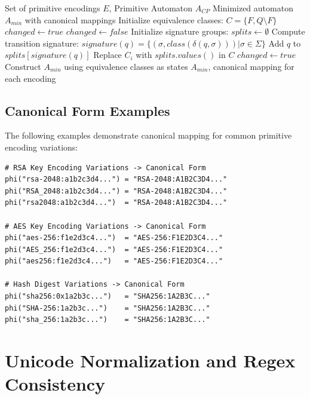 \documentclass[11pt,a4paper]{article}
\begin{document}
\begin{algorithm}
\caption{Cryptographic Primitive State Minimization}
\begin{algorithmic}[1]
\REQUIRE Set of primitive encodings $E$, Primitive Automaton $A_{CP}$
\ENSURE Minimized automaton $A_{min}$ with canonical mappings
\STATE Initialize equivalence classes: $C = \{F, Q \setminus F\}$
\STATE $changed \leftarrow true$
    \STATE $changed \leftarrow false$
        \STATE Initialize signature groups: $splits \leftarrow \emptyset$
            \STATE Compute transition signature: $signature(q) = \{(\sigma, class(\delta(q, \sigma))) | \sigma \in \Sigma\}$
            \STATE Add $q$ to $splits[signature(q)]$
        \ENDFOR
            \STATE Replace $C_i$ with $splits.values()$ in $C$
            \STATE $changed \leftarrow true$
        \ENDIF
    \ENDFOR
\ENDWHILE
\STATE Construct $A_{min}$ using equivalence classes as states
\RETURN $A_{min}$, canonical mapping for each encoding
\end{algorithmic}
\end{algorithm}

\subsection{Canonical Form Examples}

The following examples demonstrate canonical mapping for common primitive encoding variations:

\begin{lstlisting}[caption=Canonical Mapping Examples]
# RSA Key Encoding Variations -> Canonical Form
phi("rsa-2048:a1b2c3d4...") = "RSA-2048:A1B2C3D4..."
phi("RSA_2048:a1b2c3d4...") = "RSA-2048:A1B2C3D4..."
phi("rsa2048:a1b2c3d4...")  = "RSA-2048:A1B2C3D4..."

# AES Key Encoding Variations -> Canonical Form  
phi("aes-256:f1e2d3c4...")  = "AES-256:F1E2D3C4..."
phi("AES_256:f1e2d3c4...")  = "AES-256:F1E2D3C4..."
phi("aes256:f1e2d3c4...")   = "AES-256:F1E2D3C4..."

# Hash Digest Variations -> Canonical Form
phi("sha256:0x1a2b3c...")   = "SHA256:1A2B3C..."
phi("SHA-256:1a2b3c...")    = "SHA256:1A2B3C..."
phi("sha_256:1a2b3c...")    = "SHA256:1A2B3C..."
\end{lstlisting}

\section{Unicode Normalization and Regex Consistency}
\end{document}
